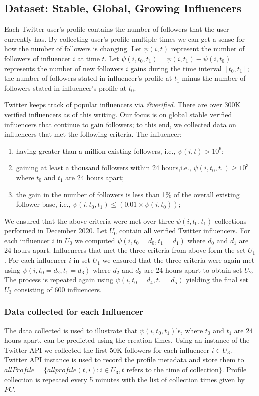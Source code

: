 \subsection{Dataset: Stable, Global, Growing Influencers}

Each Twitter user's profile contains the number of followers that the user currently has. By collecting user's profile multiple times we can get a sense for how the number of followers is changing. Let $\psi(i, t)$ represent the number of followers of influencer $i$ at time $t$. Let $\psi(i, t_0, t_1)=\psi(i, t_1)-\psi(i, t_0)$ represents the number of new followers $i$ gains during the  time  interval $[t_0, t_1]$; the number of followers stated in influencer's profile at $t_1$ minus the number of followers stated in influencer's profile at $t_0$. 

Twitter keeps track of popular influencers via \emph{@verified}. There are over 300K verified influencers as of this writing. Our focus is on global stable verified influencers that continue to gain followers; to this end, we collected data on influencers that met the following criteria. The influencer:
\begin{enumerate}
    \item having greater than a million existing followers, i.e., $\psi(i,t)>10^6$;
    \item gaining at least a thousand followers within 24 hours,i.e., $\psi(i, t_0, t_1)\geq10^3$ where $t_0$ and $t_1$ are 24 hours apart; 
    \item the gain in the number of followers is less than 1\% of the overall existing follower base, i.e., $\psi(i, t_0, t_1)\leq(0.01 \times \psi(i,t_0))$; 
\end{enumerate}

We ensured that the above criteria were met over three $\psi(i, t_0, t_1)$ collections performed in December 2020. Let $U_0$ contain all verified Twitter influencers. For each influencer $i$ in $U_0$ we computed $\psi(i, t_0=d_0, t_1=d_1)$ where $d_0$ and $d_1$ are 24-hours apart. Influencers that met the three criteria from above form the set $U_1$. For each influencer $i$ in set $U_1$ we ensured that the three criteria were again met using $\psi(i, t_0=d_2, t_1=d_3)$ where $d_2$ and $d_3$ are 24-hours apart to obtain set $U_2$. The process is repeated again using $\psi(i, t_0=d_4, t_1=d_5)$ yielding the final set $U_3$ consisting of 600 influencers.

\subsubsection{Data collected for each Influencer}
The data collected is used to illustrate that $\psi(i, t_0, t_1)$'s,  where $t_0$ and $t_1$ are 24 hours apart,  can be predicted using the creation times. Using an instance of the Twitter API we collected the first 50K followers for each influencer $i \in U_3$.
Twitter API instance is used to record the profile metadata and store them to $allProfile = \{allprofile(t, i): i \in U_3, t \mbox{ refers to the time of collection}\}$. Profile collection is repeated every 5 minutes with the list of collection times given by $PC$.

